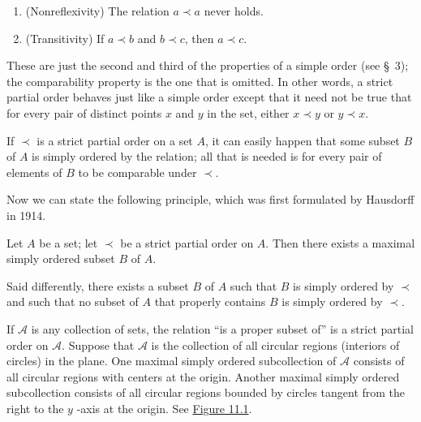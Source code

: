 \begin{enumerate}[itemsep=0.2em, parsep=0pt, topsep=0pt, partopsep=0pt, leftmargin=*, label=(\arabic*), align=left]
\item (Nonreflexivity) The relation \(a \prec a\) never holds.

\item (Transitivity) If \(a \prec b\) and \(b \prec c\), then \(a \prec c\).
\end{enumerate}
These are just the second and third of the properties of a simple order (see \S\ 3); 
the comparability property is the one that is omitted. In other words, 
a strict partial order behaves just like a simple order except that it need not be true 
that for every pair of distinct points \(x\) and \(y\) in the set, 
either \(x \prec y\) or \(y \prec x\).

If \(\prec\) is a strict partial order on a set \(A\), 
it can easily happen that some subset \(B\) of \(A\) is simply ordered by the relation; 
all that is needed is for every pair of elements of \(B\) to be comparable under \(\prec\).

Now we can state the following principle, which was first formulated by Hausdorff in 1914.

\begin{utheorem}
\label{thm:maxprinciple}
 Let \(A\) be a set; let \(\prec\) be a strict partial order on \(A\). Then there exists a maximal simply ordered subset \(B\) of \(A\).
\end{utheorem}

Said differently, there exists a subset \(B\) of \(A\) such that \(B\) 
is simply ordered by \(\prec\) and such that no subset of \(A\) that properly 
contains \(B\) is simply ordered by \(\prec\).

\begin{centeredblock}
 \begin{example}
\label{ex:\thesection.\theexample}
 If \(\mathcal{A}\) is any collection of sets, the relation ``is a proper subset of'' is a strict partial order on \(\mathcal{A}\). Suppose that \(\mathcal{A}\) is the collection of all circular regions (interiors of circles) in the plane. One maximal simply ordered subcollection of \(\mathcal{A}\) consists of all circular regions with centers at the origin. Another maximal simply ordered subcollection consists of all circular regions bounded by circles tangent from the right to the \(y\) -axis at the origin. See \hyperref[fig:11.1]{Figure 11.1}.
 \end{example}
\end{centeredblock}

